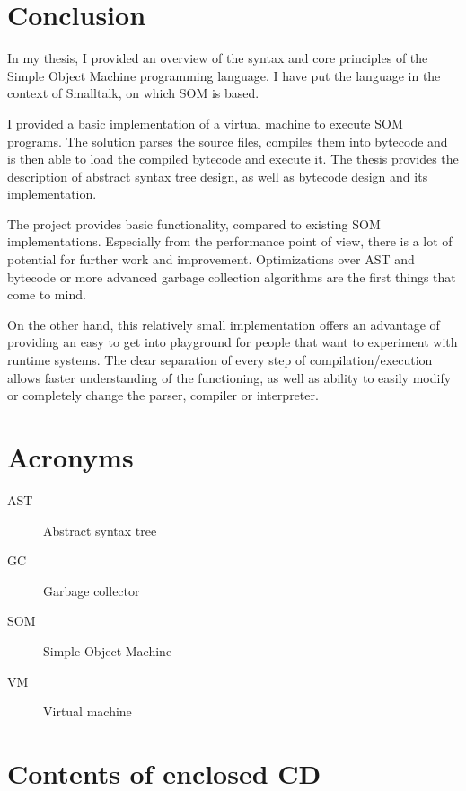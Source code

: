 \documentclass[thesis=M,english]{FITthesis}[2019/12/23]
\begin{document}
\chapter{Conclusion}
In my thesis, I provided an overview of the syntax and core principles of the Simple Object Machine programming language. I have put
the language in the context of Smalltalk, on which SOM is based.

I provided a basic implementation of a virtual machine to execute SOM programs. The solution parses the source files, compiles them into
bytecode and is then able to load the compiled bytecode and execute it. The thesis provides the description of abstract syntax tree design,
as well as bytecode design and its implementation. 

The project provides basic functionality, compared to existing SOM implementations. Especially from the performance point of view,
there is a lot of potential for further work and improvement. Optimizations over AST and bytecode or more advanced garbage collection
algorithms are the first things that come to mind.

On the other hand, this relatively small implementation offers an advantage of providing an easy to get into playground for people that
want to experiment with runtime systems. The clear separation of every step of compilation/execution allows faster understanding of the
functioning, as well as ability to easily modify or completely change the parser, compiler or interpreter.




\appendix

\chapter{Acronyms}
\begin{description}
	\item[AST] Abstract syntax tree
	\item[GC] Garbage collector
	\item[SOM] Simple Object Machine 
	\item[VM] Virtual machine 
\end{description}


\chapter{Contents of enclosed CD}


\begin{figure}
\end{figure}
\end{document}
